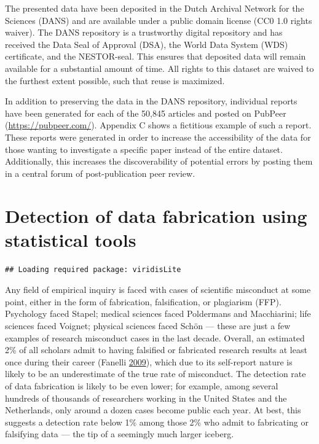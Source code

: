 \documentclass[a5paper]{book}
\begin{document}
The presented data have been deposited in the Dutch Archival Network for
the Sciences (DANS) and are available under a public domain license (CC0
1.0 rights waiver). The DANS repository is a trustworthy digital
repository and has received the Data Seal of Approval (DSA), the World
Data System (WDS) certificate, and the NESTOR-seal. This ensures that
deposited data will remain available for a substantial amount of time.
All rights to this dataset are waived to the furthest extent possible,
such that reuse is maximized.

In addition to preserving the data in the DANS repository, individual
reports have been generated for each of the 50,845 articles and posted
on PubPeer (\url{https://pubpeer.com/}). Appendix C shows a fictitious
example of such a report. These reports were generated in order to
increase the accessibility of the data for those wanting to investigate
a specific paper instead of the entire dataset. Additionally, this
increases the discoverability of potential errors by posting them in a
central forum of post-publication peer review.

\chapter{Detection of data fabrication using statistical
tools}\label{detection-of-data-fabrication-using-statistical-tools}

\begin{verbatim}
## Loading required package: viridisLite
\end{verbatim}

Any field of empirical inquiry is faced with cases of scientific
misconduct at some point, either in the form of fabrication,
falsification, or plagiarism (FFP). Psychology faced Stapel; medical
sciences faced Poldermans and Macchiarini; life sciences faced Voignet;
physical sciences faced Schön --- these are just a few examples of
research misconduct cases in the last decade. Overall, an estimated 2\%
of all scholars admit to having falsified or fabricated research results
at least once during their career (Fanelli
\protect\hyperlink{ref-doi:10.1371ux2fjournal.pone.0005738}{2009}),
which due to its self-report nature is likely to be an underestimate of
the true rate of misconduct. The detection rate of data fabrication is
likely to be even lower; for example, among several hundreds of
thousands of researchers working in the United States and the
Netherlands, only around a dozen cases become public each year. At best,
this suggests a detection rate below 1\% among those 2\% who admit to
fabricating or falsifying data --- the tip of a seemingly much larger
iceberg.
\end{document}

